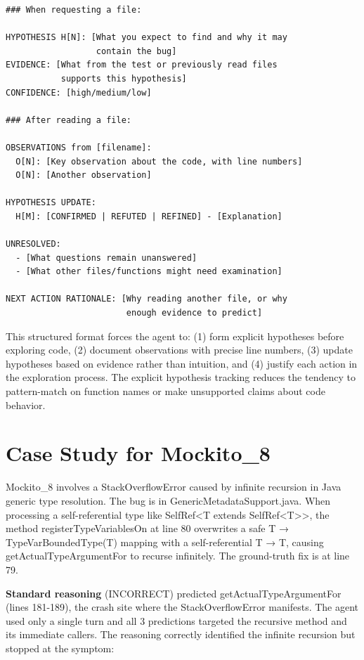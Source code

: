 \documentclass[]{meta}
\begin{document}
\begin{tcolorbox}[
  colback=gray!5,
  colframe=gray!75!black,
  breakable,
  enhanced
]
\begin{verbatim}
### When requesting a file:

HYPOTHESIS H[N]: [What you expect to find and why it may
                  contain the bug]
EVIDENCE: [What from the test or previously read files
           supports this hypothesis]
CONFIDENCE: [high/medium/low]

### After reading a file:

OBSERVATIONS from [filename]:
  O[N]: [Key observation about the code, with line numbers]
  O[N]: [Another observation]

HYPOTHESIS UPDATE:
  H[M]: [CONFIRMED | REFUTED | REFINED] - [Explanation]

UNRESOLVED:
  - [What questions remain unanswered]
  - [What other files/functions might need examination]

NEXT ACTION RATIONALE: [Why reading another file, or why
                        enough evidence to predict]
\end{verbatim}
\end{tcolorbox}

This structured format forces the agent to: (1) form explicit hypotheses before exploring code, (2) document observations with precise line numbers, (3) update hypotheses based on evidence rather than intuition, and (4) justify each action in the exploration process. The explicit hypothesis tracking reduces the tendency to pattern-match on function names or make unsupported claims about code behavior.


\section{Case Study for Mockito\_8}
\label{app:mockito8}

Mockito\_8 involves a StackOverflowError caused by infinite recursion in Java generic type resolution.
The bug is in GenericMetadataSupport.java.
When processing a self-referential type like SelfRef<T extends SelfRef<T>>, the method registerTypeVariablesOn at line 80 overwrites a safe T → TypeVarBoundedType(T) mapping with a self-referential T → T, causing getActualTypeArgumentFor to recurse infinitely. The ground-truth fix is at line 79.

\textbf{Standard reasoning} (INCORRECT) predicted getActualTypeArgumentFor (lines 181-189), the crash site where the StackOverflowError manifests. The agent used only a single turn and all 3 predictions targeted the recursive method and its immediate callers. The reasoning correctly identified the infinite recursion but stopped at the symptom:
\end{document}
